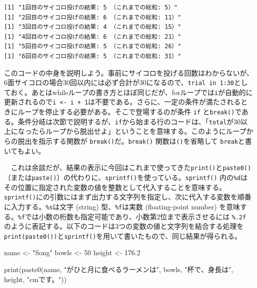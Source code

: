 \documentclass[
  a4paper,
  pandoc,
  ja=standard,
  jafont=haranoaji]{bxjsbook}
\newenvironment{Shaded}{\begin{snugshade}}{\end{snugshade}}
\newcommand{\DecValTok}[1]{\textcolor[rgb]{0.68,0.00,0.00}{#1}}
\newcommand{\FloatTok}[1]{\textcolor[rgb]{0.68,0.00,0.00}{#1}}
\newcommand{\FunctionTok}[1]{\textcolor[rgb]{0.28,0.35,0.67}{#1}}
\newcommand{\NormalTok}[1]{\textcolor[rgb]{0.00,0.48,0.65}{#1}}
\newcommand{\OtherTok}[1]{\textcolor[rgb]{0.00,0.48,0.65}{#1}}
\newcommand{\StringTok}[1]{\textcolor[rgb]{0.13,0.47,0.30}{#1}}
\begin{document}
\begin{verbatim}
[1] "1回目のサイコロ投げの結果: 5 （これまでの総和: 5）"
[1] "2回目のサイコロ投げの結果: 6 （これまでの総和: 11）"
[1] "3回目のサイコロ投げの結果: 4 （これまでの総和: 15）"
[1] "4回目のサイコロ投げの結果: 6 （これまでの総和: 21）"
[1] "5回目のサイコロ投げの結果: 5 （これまでの総和: 26）"
[1] "6回目のサイコロ投げの結果: 5 （これまでの総和: 31）"
\end{verbatim}

このコードの中身を説明しよう。事前にサイコロを投げる回数はわからないが、6面サイコロの場合30回以内には必ず合計が30になるので、\texttt{trial\ in\ 1:30}としておく。あとはwhileループの書き方とほぼ同じだが、forループでは\texttt{i}が自動的に更新されるので\texttt{i\ \textless{}-\ i\ +\ 1}は不要である。さらに、一定の条件が満たされるときにループを停止する必要がある。そこで登場するのが条件
\texttt{if}
と\texttt{break()}である。条件分岐は次節で説明するが、\texttt{if}から始まる行のコードは、「\texttt{total}が30以上になったらループから脱出せよ」ということを意味する。このようにループからの脱出を指示する関数が
\texttt{break()}だ。\texttt{break()} 関数は\texttt{()}を省略して
\texttt{break}と書いてもよい。

　これは余談だが、結果の表示に今回はこれまで使ってきた\texttt{print()}と\texttt{paste0()}（または\texttt{paste()}）の代わりに、\texttt{sprintf()}を使っている。\texttt{sprintf()}
内の\texttt{\%d}はその位置に指定された変数の値を整数として代入することを意味する。\texttt{sprintf()}にの引数にはまず出力する文字列を指定し、次に代入する変数を順番に入力する。\texttt{\%s}は文字
(string) 型、\texttt{\%f}は実数 (floating-point number)
を意味する。\texttt{\%f}では小数の桁数も指定可能であり、小数第2位まで表示させるには
\texttt{\%.2f}
のように表記する。以下のコードは3つの変数の値と文字列を結合する処理を\texttt{print(paste0())}と\texttt{sprintf()}を用いて書いたもので、同じ結果が得られる。

\begin{Shaded}
\begin{Highlighting}[numbers=left,,]
\NormalTok{name   }\OtherTok{\textless{}{-}} \StringTok{"Song"}
\NormalTok{bowls  }\OtherTok{\textless{}{-}} \DecValTok{50}
\NormalTok{height }\OtherTok{\textless{}{-}} \FloatTok{176.2}

\FunctionTok{print}\NormalTok{(}\FunctionTok{paste0}\NormalTok{(name, }\StringTok{"がひと月に食べるラーメンは"}\NormalTok{, bowls, }\StringTok{"杯で、身長は"}\NormalTok{, height, }\StringTok{"cmです。"}\NormalTok{))}
\end{Highlighting}
\end{Shaded}
\end{document}

